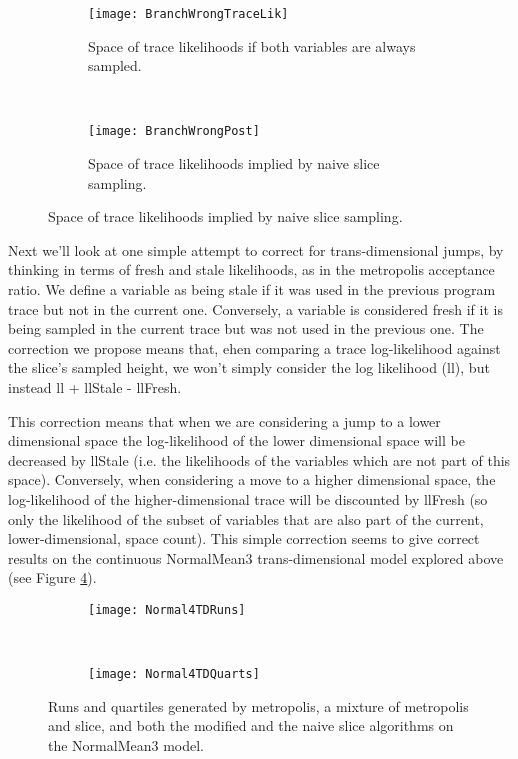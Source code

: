 \begin{figure}[h]
        \centering
        \begin{subfigure}[b]{0.48\textwidth}
                \centering
                \texttt{[image: BranchWrongTraceLik]}
                \caption{Space of trace likelihoods if both variables are always sampled.}
                \label{fig:branchWrongTraceLik}
        \end{subfigure}
        ~ 
        \begin{subfigure}[b]{0.48\textwidth}
                \centering
                \texttt{[image: BranchWrongPost]}
                \caption{Space of trace likelihoods implied by naive slice sampling.}
                \label{fig:branchWrongPost}
        \end{subfigure}
\end{figure}

Next we'll look at one simple attempt to correct for trans-dimensional jumps, by thinking in terms of fresh and stale likelihoods, as in the metropolis acceptance ratio. We define a variable as being stale if it was used in the previous program trace but not in the current one. Conversely, a variable is considered fresh if it is being sampled in the current trace but was not used in the previous one. The correction we propose means that, ehen comparing a trace log-likelihood against the slice's sampled height, we won't simply consider the log likelihood (ll), but instead ll + llStale - llFresh.

This correction means that when we are considering a jump to a lower dimensional space the log-likelihood of the lower dimensional space will be decreased by llStale (i.e. the likelihoods of the variables which are not part of this space). Conversely, when considering a move to a higher dimensional space, the log-likelihood of the higher-dimensional trace will be discounted by llFresh (so only the likelihood of the subset of variables that are also part of the current, lower-dimensional, space count). This simple correction seems to give correct results on the continuous NormalMean3 trans-dimensional model explored above (see Figure \ref{fig:normal4TD}).

\begin{figure}[h]
        \centering
        \begin{subfigure}[b]{0.48\textwidth}
                \centering
                \texttt{[image: Normal4TDRuns]}
        \end{subfigure}
        ~ 
        \begin{subfigure}[b]{0.48\textwidth}
                \centering
                \texttt{[image: Normal4TDQuarts]}
        \end{subfigure}
    \caption{Runs and quartiles generated by metropolis, a mixture of metropolis and slice, and both the modified and the naive slice algorithms on the NormalMean3 model.}
    \label{fig:normal4TD}
\end{figure}


